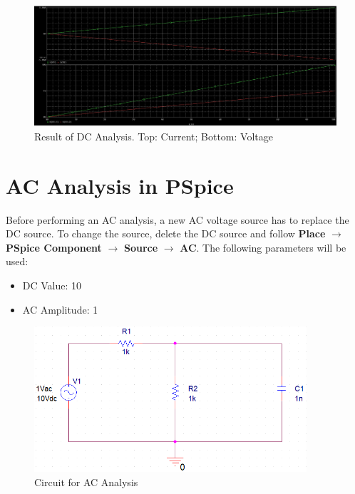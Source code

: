 \documentclass[12pt]{../manual}
\begin{document}
\begin{figure}[ht!]
\begin{center}
\includegraphics[width=\textwidth]{figures/ResultDCAnalysisCrop.PNG}
\caption[Result of DC Analysis]{Result of DC Analysis. Top: Current; Bottom: Voltage}
\label{fig:dcAnalRes}
\end{center}
\end{figure}
%
\newpage
\section{AC Analysis in PSpice}
Before performing an AC analysis, a new AC voltage source has to replace the DC source. To change the source, delete the DC source and follow \textbf{Place} $\to$ \textbf{PSpice Component} $\to$ \textbf{Source} $\to$ \textbf{AC}. The following parameters will be used:
\begin{itemize}
\item DC Value: 10
\item AC Amplitude: 1
\end{itemize}

\begin{figure}[ht!]
	\begin{center}
		\includegraphics[width=0.9\textwidth]{figures/ACAnalysisCircuitCrop.PNG}
	\end{center}
	\caption{Circuit for AC Analysis}
	\label{fig:ac}
\end{figure}
\end{document}
